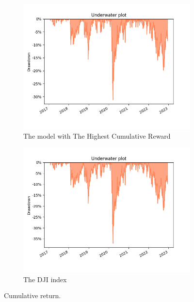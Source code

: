\documentclass[../xlapes02]{subfiles}
\begin{document}
\begin{figure}[h!]
\begin{subfigure}[t]{\experimentimgwidth\textwidth}
        \end{subfigure}
        \vspace{0.5cm}
        \begin{subfigure}[t]{\experimentimgwidth\textwidth}
            \centering
            \includegraphics[width=\linewidth]{image/figure/drawdown_underwater_max}
            \caption{The model with The Highest Cumulative Reward}
            \label{fig:drawdown_underwater_max}
        \end{subfigure}
        \hfill
        \begin{subfigure}[t]{\experimentimgwidth\textwidth}
            \centering
            \includegraphics[width=\linewidth]{image/figure/drawdown_underwater_dji}
            \caption{The DJI index}
            \label{fig:drawdown_underwater_dji}
        \end{subfigure}
        \caption{Cumulative return.}
        \label{fig:cumulative_return}
    \end{figure}
\end{document}
